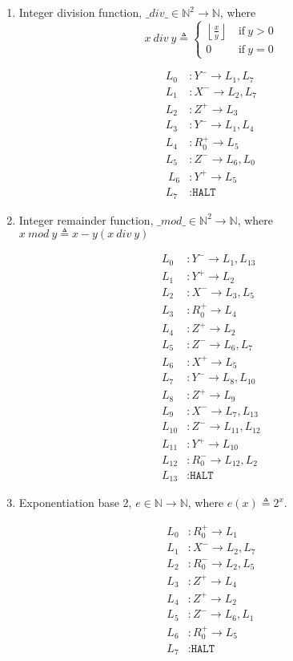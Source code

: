 \documentclass[10pt,\jkfside,a4paper]{article}
\begin{document}
\begin{enumerate}
\begin{enumerate}[label=(\alph*)]
\item Integer division function, $\_ div \_ \in \mathbb{N}^2 \to
\mathbb{N}$, where
\[
x \ div \ y \triangleq \begin{cases}
\left\lfloor \frac{x}{y} \right\rfloor & \ \text{if} \ y > 0 \\
0 & \ \text{if} \ y = 0
\end{cases}
\]

\begin{align*}
L_0 &: Y^- \to L_1, L_7 \\
L_1 &: X^- \to L_2, L_7 \\
L_2 &: Z^+ \to L_3 \\
L_3 &: Y^- \to L_1, L_4 \\
L_4 &: R_0^+ \to L_5 \\
L_5 &: Z^- \to L_6, L_0 \\\
L_6 &: Y^+ \to L_5 \\
L_7 &: \texttt{HALT}
\end{align*}

\item Integer remainder function, $\_mod\_ \in \mathbb{N}^2 \to \mathbb{N}$, 
where $x \ mod \ y \triangleq x - y (x \ div \ y)$

\begin{align*}
L_0		&: Y^- \to L_1, L_{13} \\
L_1		&: Y^+ \to L_2 \\
L_2		&: X^- \to L_3, L_5 \\
L_3		&: R_0^+ \to L_4 \\
L_4		&: Z^+ \to L_2 \\
L_5		&: Z^- \to L_6, L_7 \\
L_6		&: X^+ \to L_5 \\
L_7		&: Y^- \to L_8, L_{10} \\
L_8		&: Z^+ \to L_9 \\
L_9		&: X^- \to L_7, L_{13} \\
L_{10}	&: Z^- \to L_{11}, L_{12}\\
L_{11}	&: Y^+ \to L_{10} \\
L_{12}	&: R_0^- \to L_{12}, L_2 \\
L_{13}	&: \texttt{HALT}
\end{align*}

\item Exponentiation base 2, $e \in \mathbb{N} \to \mathbb{N}$, where $e(x)
\triangleq 2^x$.

\begin{align*}
L_0 &: R_0^+ \to L_1 \\
L_1 &: X^- \to L_2, L_7 \\
L_2 &: R_0^- \to L_2, L_5 \\
L_3 &: Z^+ \to L_4 \\
L_4 &: Z^+ \to L_2 \\
L_5 &: Z^- \to L_6, L_1 \\
L_6 &: R_0^+ \to L_5 \\
L_7 &: \texttt{HALT}
\end{align*}


\end{enumerate}
\end{enumerate}
\end{document}
